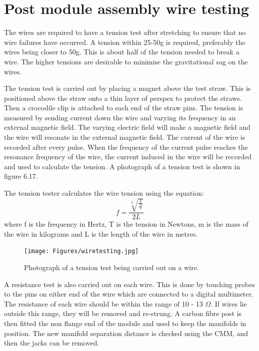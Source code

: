 \section{Post module assembly wire testing}

The wires are required to have a tension test after stretching to ensure that no wire failures have occurred. A tension within 25-50g is required, preferably the wires being closer to 50g. This is about half of the tension needed to break a wire. The higher tensions are desirable to minimise the gravitational sag on the wires.

The tension test is carried out by placing a magnet above the test straw. This is positioned above the straw onto a thin layer of perspex to protect the straws. Then a crocodile clip is attached to each end of the straw pins. The tension is measured by sending current down the wire and varying its frequency in an external magnetic field. The varying electric field will make a magnetic field and the wire will resonate in the external magnetic field. The current of the wire is recorded after every pulse. When the frequency of the current pulse reaches the resonance frequency of the wire, the current induced in the wire will be recorded and used to calculate the tension. A photograph of a tension test is shown in figure 6.17.

The tension tester calculates the wire tension using the equation: 
\begin{equation}
f=\frac{\sqrt[2]{\frac{T}{\frac{m}{L}}}}{2L}
\end{equation}
where f is the frequency in Hertz, T is the tension in Newtons, m is the mass of the wire in kilograms and L is the length of the wire in metres. 

\begin{figure}[!h]
\centering 
\texttt{[image: Figures/wiretesting.jpg]}
\decoRule
\caption{Photograph of a tension test being carried out on a wire.}
\label{fig:wiretesting}
\end{figure}

A resistance test is also carried out on each wire. This is done by touching probes to the pins on either end of the wire which are connected to a digital multimeter. The resistance of each wire should be within the range of 10 - 13 $\Omega$. If wires lie outside this range, they will be removed and re-strung. A carbon fibre post is then fitted the non flange end of the module and used to keep the manifolds in position. The new manifold separation distance is checked using the CMM, and then the jacks can be removed.

